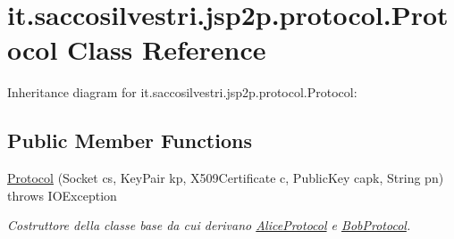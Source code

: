 \hypertarget{classit_1_1saccosilvestri_1_1jsp2p_1_1protocol_1_1_protocol}{
\section{it.saccosilvestri.jsp2p.protocol.\-Protocol \-Class \-Reference}
\label{classit_1_1saccosilvestri_1_1jsp2p_1_1protocol_1_1_protocol}
}


\-Inheritance diagram for it.saccosilvestri.jsp2p.protocol.\-Protocol\-:
\subsection*{\-Public \-Member \-Functions}
\begin{DoxyCompactItemize}
\item 
\hyperlink{classit_1_1saccosilvestri_1_1jsp2p_1_1protocol_1_1_protocol_a41b3f8af2182ce1d95ac4622c689110c}{\-Protocol} (\-Socket cs, \-Key\-Pair kp, \-X509\-Certificate c, \-Public\-Key capk, \-String pn)  throws I\-O\-Exception 
\begin{DoxyCompactList}\small\item\em \-Costruttore della classe base da cui derivano \hyperlink{classit_1_1saccosilvestri_1_1jsp2p_1_1protocol_1_1_alice_protocol}{\-Alice\-Protocol} e \hyperlink{classit_1_1saccosilvestri_1_1jsp2p_1_1protocol_1_1_bob_protocol}{\-Bob\-Protocol}. \end{DoxyCompactList}\end{DoxyCompactItemize}
